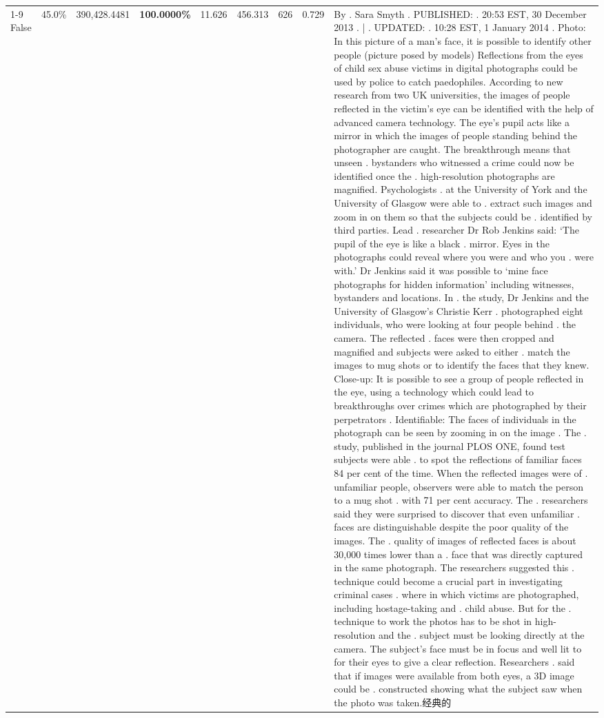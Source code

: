 \begin{table}[H]
\begin{tabular}{lllrlllll}
\cline{1-9}
False & 45.0\% & 390,428.4481 & \bfseries \color{red} 100.0000\% & 11.626 & 456.313 & 626 & 0.729 & By . Sara Smyth . PUBLISHED: . 20:53 EST, 30 December 2013 . | . UPDATED: . 10:28 EST, 1 January 2014 . Photo: In this picture of a man's face, it is possible to identify other people (picture posed by models) Reflections from the eyes of child sex abuse victims in digital photographs could be used by police to catch paedophiles. According to new research from two UK universities, the images of people reflected in the victim's eye can be identified with the help of advanced camera technology. The eye's pupil acts like a mirror in which the images of people standing behind the photographer are caught. The breakthrough means that unseen . bystanders who witnessed a crime could now be identified once the . high-resolution photographs are magnified. Psychologists . at the University of York and the University of Glasgow were able to . extract such images and zoom in on them so that the subjects could be . identified by third parties. Lead . researcher Dr Rob Jenkins said: ‘The pupil of the eye is like a black . mirror. Eyes in the photographs could reveal where you were and who you . were with.' Dr Jenkins said it was possible to ‘mine face photographs for hidden information' including witnesses, bystanders and locations. In . the study, Dr Jenkins and the University of Glasgow's Christie Kerr . photographed eight individuals, who were looking at four people behind . the camera. The reflected . faces were then cropped and magnified and subjects were asked to either . match the images to mug shots or to identify the faces that they knew. Close-up: It is possible to see a group of people reflected in the eye, using a technology which could lead to breakthroughs over crimes which are photographed by their perpetrators . Identifiable: The faces of individuals in the photograph can be seen by zooming in on the image . The . study, published in the journal PLOS ONE, found test subjects were able . to spot the reflections of familiar faces 84 per cent of the time. When the reflected images were of . unfamiliar people, observers were able to match the person to a mug shot . with 71 per cent accuracy. The . researchers said they were surprised to discover that even unfamiliar . faces are distinguishable despite the poor quality of the images. The . quality of images of reflected faces is about 30,000 times lower than a . face that was directly captured in the same photograph. The researchers suggested this . technique could become a crucial part in investigating criminal cases . where in which victims are photographed, including hostage-taking and . child abuse. But for the . technique to work the photos has to be shot in high-resolution and the . subject must be looking directly at the camera. The subject's face must be in focus and well lit to for their eyes to give a clear reflection. Researchers . said that if images were available from both eyes, a 3D image could be . constructed showing what the subject saw when the photo was taken.经典的 \\

\end{tabular}
\end{table}
